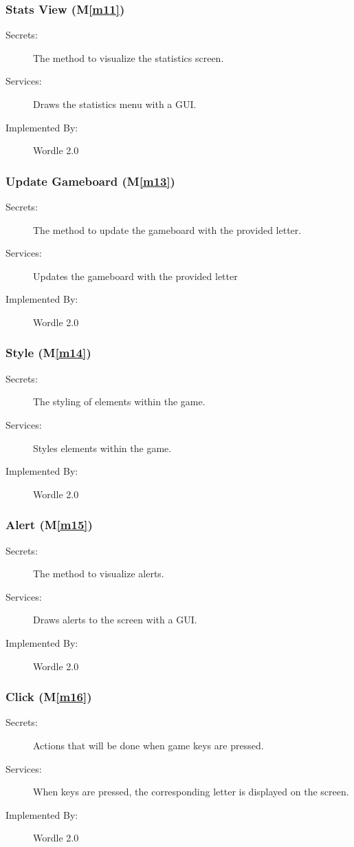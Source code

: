\documentclass[12pt, titlepage]{article}
\newcommand{\mref}[1]{M\ref{#1}}
\begin{document}
	\subsubsection{Stats View (\mref{m11})}
	\begin{description}
		\item[Secrets:]The method to visualize the statistics screen.
		\item[Services:]Draws the statistics menu with a GUI.
		\item[Implemented By:] Wordle 2.0
	\end{description}
	
	\subsubsection{Update Gameboard (\mref{m13})}
	\begin{description}
		\item[Secrets:]The method to update the gameboard with the provided letter.
		\item[Services:] Updates the gameboard with the provided letter
		\item[Implemented By:] Wordle 2.0
	\end{description}
	
	\subsubsection{Style (\mref{m14})}
	\begin{description}
		\item[Secrets:]The styling of elements within the game.
		\item[Services:]Styles elements within the game.
		\item[Implemented By:] Wordle 2.0
	\end{description}
	
	\subsubsection{Alert (\mref{m15})}
	\begin{description}
		\item[Secrets:]The method to visualize alerts.
		\item[Services:]Draws alerts to the screen with a GUI.
		\item[Implemented By:] Wordle 2.0
	\end{description}
	
	\subsubsection{Click (\mref{m16})}
	\begin{description}
		\item[Secrets:]Actions that will be done when game keys are pressed.
		\item[Services:]When keys are pressed, the corresponding letter is displayed on the screen.
		\item[Implemented By:] Wordle 2.0
	\end{description}
	
\end{document}
